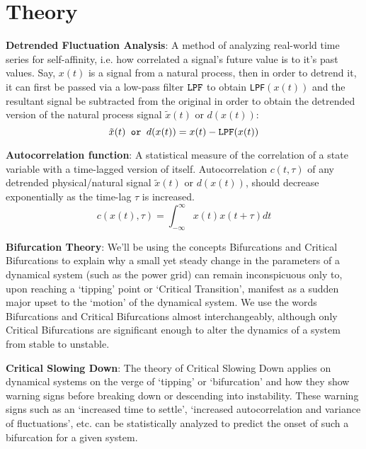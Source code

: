 \section[Theory]{Theory}
\label{sec:theory}

\textbf{Detrended Fluctuation Analysis}: A method of analyzing real-world time series for self-affinity, i.e. how correlated a signal's future value is to it's past values. Say, $x(t)$ is a signal from a natural process, then in order to detrend it, it can first be passed via a low-pass filter $\verb|LPF|$ to obtain \verb|LPF|$(x(t))$ and the resultant signal be subtracted from the original in order to obtain the detrended version of the natural process signal $\tilde{x}(t)$ or $d(x(t))$:
\begin{equation}
	\tilde{x}(t) \verb| or | d(x(t)) = x(t) - \verb|LPF|(x(t))
\end{equation}

\textbf{Autocorrelation function}: A statistical measure of the correlation of a state variable with a time-lagged version of itself. Autocorrelation $c(t, \tau)$ of any detrended physical/natural signal $\tilde{x}(t)$ or $d(x(t))$, should decrease exponentially as the time-lag $\tau$ is increased.
\begin{equation}
	c(x(t), \tau) = \int_{-\infty}^{\infty}x(t)x(t+\tau)dt  
\end{equation}

\textbf{Bifurcation Theory}: We'll be using the concepts Bifurcations and Critical Bifurcations to explain why a small yet steady change in the parameters of a dynamical system (such as the power grid) can remain inconspicuous only to, upon reaching a `tipping' point or `Critical Transition', manifest as a sudden major upset to the `motion' of the dynamical system. We use the words Bifurcations and Critical Bifurcations almost interchangeably, although only Critical Bifurcations are significant enough to alter the dynamics of a system from stable to unstable.

\textbf{Critical Slowing Down}: The theory of Critical Slowing Down applies on dynamical systems on the verge of `tipping' or `bifurcation' and how they show warning signs before breaking down or descending into instability. These warning signs such as an `increased time to settle', `increased autocorrelation and variance of fluctuations', etc. \cite{schefferEarlyWarningSignalsForCriticalTransitions} can be statistically analyzed to predict the onset of such a bifurcation for a given system.

